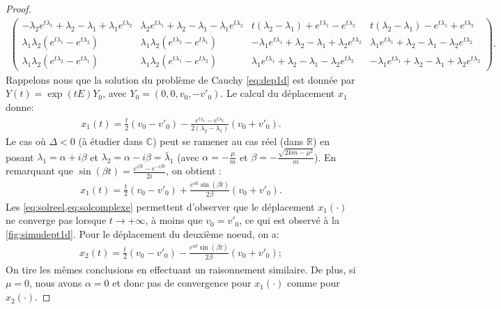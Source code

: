 \begin{proof}
\begin{align*}
\begin{pmatrix}
         -\lambda_2e^{t\lambda_1} + \lambda_2 - \lambda_1 + \lambda_1e^{t\lambda_2} & \lambda_2e^{t\lambda_1} + \lambda_2 - \lambda_1 - \lambda_1e^{t\lambda_2} & t(\lambda_2 -\lambda_1) + e^{t\lambda_1} - e^{t\lambda_2} & t(\lambda_2 -\lambda_1) - e^{t\lambda_1} + e^{t\lambda_2} \\
          \lambda_1\lambda_2 (e^{t\lambda_1} - e^{t\lambda_2}) & \lambda_1\lambda_2 (e^{t\lambda_2} - e^{t\lambda_1})  & -\lambda_1e^{t\lambda_1} + \lambda_2 - \lambda_1 + \lambda_2e^{t\lambda_2} & \lambda_1e^{t\lambda_1} + \lambda_2 - \lambda_1 - \lambda_2e^{t\lambda_2} \\
          \lambda_1\lambda_2 (e^{t\lambda_2} - e^{t\lambda_1})  & \lambda_1\lambda_2 (e^{t\lambda_1} - e^{t\lambda_2})  & \lambda_1e^{t\lambda_1} + \lambda_2 - \lambda_1 - \lambda_2e^{t\lambda_2} & -\lambda_1e^{t\lambda_1} + \lambda_2 - \lambda_1 + \lambda_2e^{t\lambda_2}
    \end{pmatrix}.
\end{align*}
Rappelons nous que la solution du problème de Cauchy \cref{eq:dep1d} est donnée par $Y(t) = \exp(tE)Y_0$, avec $Y_0 = (0,0,v_0,-v'_0)$. Le calcul du déplacement $x_1$ donne:
\begin{align} \label{eq:solreel}
    x_1(t) = \frac{t}{2}\left( v_0 - v'_0 \right) - \frac{e^{t\lambda_1} - e^{t\lambda_2}}{2(\lambda_2 - \lambda_1)}\left( v_0 + v'_0 \right).
\end{align}
Le cas où $\Delta < 0$ (à étudier dans $\mathbb{C}$) peut se ramener au cas réel (dans $\mathbb{R}$) en posant $\lambda_1 = \alpha + i \beta$ et $\lambda_2 = \alpha - i \beta = \bar{\lambda}_1$ (avec $\alpha = -\frac{\mu}{m}$ et $\beta = -\frac{\sqrt{2km - \mu^2}}{m}$). En remarquant que $\sin(\beta t) = \frac{e^{i\beta t} - e^{-i\beta t}}{2i}$, on obtient :
\begin{align} \label{eq:solcomplexe}
    x_1(t) = \frac{t}{2}\left( v_0 - v'_0 \right) + \frac{e^{\alpha t} \sin(\beta t)}{2\beta} \left( v_0 + v'_0 \right).
\end{align}
Les \cref{eq:solreel,eq:solcomplexe} permettent d'observer que le déplacement $x_1(\cdot)$ ne converge pas lorsque $t \rightarrow +\infty$, à moins que $v_0 = v'_0$, ce qui est observé à la \cref{fig:simudept1d}. Pour le déplacement du deuxième noeud, on a:
\begin{align} \label{eq:solcomplexe}
    x_2(t) = \frac{t}{2}\left( v_0 - v'_0 \right) - \frac{e^{\alpha t} \sin(\beta t)}{2\beta} \left( v_0 + v'_0 \right);
\end{align}
On tire les mêmes conclusions en effectuant un raisonnement similaire. De plus, si $\mu=0$, nous avons $\alpha=0$ et donc pas de convergence pour $x_1(\cdot)$ comme pour $x_2(\cdot)$. 

\end{proof}










